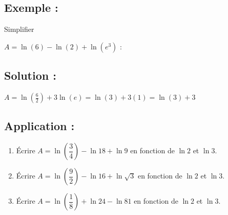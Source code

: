 \documentclass[12pt,a4paper]{article}
\begin{document}
\vspace{0.3cm}

\subsection*{\color{myred}Exemple :}
Simplifier 

$A = \ln(6) - \ln(2) + \ln(e^3)$ :

\subsection*{\color{myred}Solution :}

$
A = \ln\left(\frac{6}{2}\right) + 3\ln(e) = \ln(3) + 3(1) = \ln(3) + 3$

\subsection*{\color{myred}Application :}
\begin{enumerate}
    \item Écrire $A = \ln\left(\dfrac{3}{4}\right) - \ln 18 + \ln 9$ en fonction de $\ln 2$ et $\ln 3$.
    \item Écrire $A = \ln\left(\dfrac{9}{2}\right) - \ln 16 + \ln \sqrt{3}$ en fonction de $\ln 2$ et $\ln 3$.
      \item Écrire $A = \ln\left(\dfrac{1}{8}\right) + \ln 24 - \ln 81$ en fonction de $\ln 2$ et $\ln 3$.
\end{enumerate}
\end{document}
